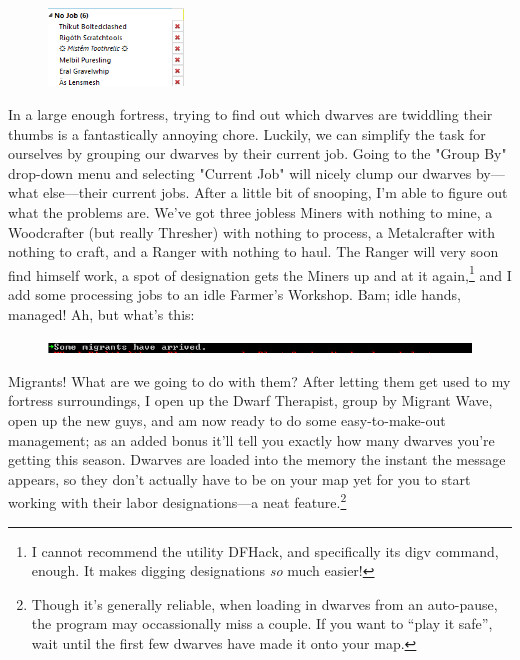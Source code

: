 \documentclass[]{article}
\begin{document}
\begin{figure}
\vspace{-20pt}
  \begin{center}
    \includegraphics[width=0.32\textwidth]{Sec2Fig7}
  \end{center}
\vspace{-10pt}
\end{figure}
In a large enough fortress, trying to find out which dwarves are twiddling their thumbs is a
fantastically annoying chore. Luckily, we can simplify the task for ourselves by grouping our dwarves by
their current job. Going to the "Group By" drop-down menu and selecting "Current Job" will nicely clump
our dwarves by---what else---their current jobs. After a little bit of snooping, I'm able to figure out
what the problems are. We've got three jobless Miners with nothing to mine, a Woodcrafter (but really
Thresher) with nothing to process, a Metalcrafter with nothing to craft, and a Ranger with nothing to
haul. The Ranger will very soon find himself work, a spot of designation gets the Miners up and at it
again,\footnote{I cannot recommend the utility DFHack, and specifically its digv command, enough. It
makes digging designations \emph{so} much easier!} and I add some processing jobs to an idle Farmer's
Workshop. Bam; idle hands, managed! Ah, but what's this:

\begin{figure}[h!]
\centering
\includegraphics[width=\linewidth]{Sec2Fig8}
\end{figure}

Migrants! What are we going to do with them? After letting them get used to my fortress surroundings, I
open up the Dwarf Therapist, group by Migrant Wave, open up the new guys, and am now ready to do some
easy-to-make-out management; as an added bonus it'll tell you exactly how many dwarves you're getting
this season. Dwarves are loaded into the memory the instant the message appears, so they
don't actually have to be on your map yet for you to start working with their labor designations---a
neat feature.\footnote{Though it's generally reliable, when loading in dwarves from an auto-pause, the
program may occassionally miss a couple. If you want to ``play it safe'', wait until the first few
dwarves have made it onto your map.}
\end{document}
